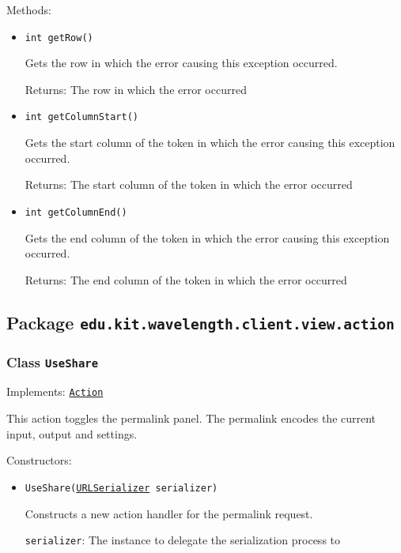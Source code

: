 Methods:
\begin{itemize}
\item \texttt{int getRow()}

Gets the row in which the error causing this exception occurred.

Returns: The row in which the error occurred

\item \texttt{int getColumnStart()}

Gets the start column of the token in which the error causing this exception
 occurred.

Returns: The start column of the token in which the error occurred

\item \texttt{int getColumnEnd()}

Gets the end column of the token in which the error causing this exception
 occurred.

Returns: The end column of the token in which the error occurred

\end{itemize}

\subsection{Package \lstinline{edu.kit.wavelength.client.view.action}}
\label{pkg:edu.kit.wavelength.client.view.action}


\subsubsection{Class \texttt{UseShare}}
\label{type:edu.kit.wavelength.client.view.action.UseShare}
Implements: \texttt{\hyperref[type:edu.kit.wavelength.client.view.action.Action]{Action}}

This action toggles the permalink panel. The permalink encodes the current
 input, output and settings.

Constructors:
\begin{itemize}
\item \texttt{UseShare(\hyperref[type:edu.kit.wavelength.client.view.URLSerializer]{URLSerializer} serializer)}

Constructs a new action handler for the permalink request.

\texttt{serializer}: The instance to delegate the serialization process to

\end{itemize}

